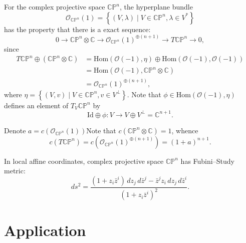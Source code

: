 \documentclass[11pt]{homework}
\theoremstyle{indented}
\begin{document}
\begin{remark}
    For the complex projective space $\mathbb{CP}^n$, the hyperplane bundle 
    \begin{equation*}
        \mathcal{O}_{\mathbb{CP}^n}(1) = \left\{(V,\lambda) \mid V \in \mathbb{CP}^n , \lambda \in V^\ast \right\}
    \end{equation*}
    has the property that there is a exact sequence:
    \begin{equation*}
        0 \to \mathbb{CP}^n \otimes \mathbb C  \to \mathcal{O}_{\mathbb{CP}^n}(1) ^{\oplus (n+1)} \to T \mathbb{CP}^n \to 0,
    \end{equation*}
    since
    \begin{align*}
        T \mathbb{CP}^n \oplus \left(\mathbb{CP}^n \otimes \mathbb C\right) &= \mathrm{Hom}(\mathcal{O}(-1), \eta) \oplus \mathrm{Hom}(\mathcal{O}(-1), \mathcal{O}(-1)) \\
        &= \mathrm{Hom}(\mathcal{O}(-1), \mathbb{CP}^n \otimes \mathbb C) \\
        &= \mathcal{O}_{\mathbb{CP}^n}(1) ^{\oplus (n+1)},
    \end{align*}
    where $\eta = \left\{(V,v) \mid V \in \mathbb{CP}^n , v \in V^{\bot} \right\}$.
    Note that $\phi \in \mathrm{Hom}(\mathcal{O}(-1), \eta)$ defines an element of $T_V \mathbb{CP}^n$ by 
    \begin{equation*}
        \mathrm{Id} \oplus \phi : V \to V \oplus V^{\bot} = \mathbb{C}^{n+1}.
    \end{equation*}

    Denote $a = c\left(\mathcal{O}_{\mathbb{CP}^n}(1)\right)$Note that $c\left(\mathbb{CP}^n \otimes \mathbb C\right) =1$, whence 
    \begin{equation*}
        c \left(T \mathbb{CP}^n\right) = c\left(\mathcal{O}_{\mathbb{CP}^n}(1) ^{\oplus (n+1)}\right) = (1+a)^{n+1}.
    \end{equation*}
\end{remark}

\begin{remark}
    In local affine coordinates, complex projective space $\mathbb{CP}^n$ has Fubini–Study metric:
    \begin{equation*}
        ds^{2} = \frac {(1+z_{i}{\bar {z}}^{i})\,dz_{j}\,d{\bar {z}}^{j}-{\bar {z}}^{j}z_{i}\,dz_{j}\,d{\bar {z}}^{i}}{(1+z_{i}{\bar {z}}^{i})^{2}}.
    \end{equation*}
\end{remark}

\section{Application}
\end{document}
